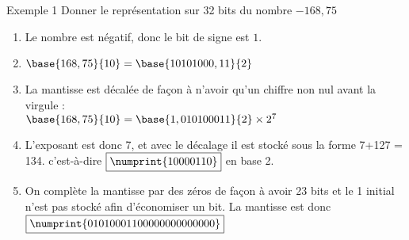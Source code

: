 \documentclass[10pt,french]{beamer}
\begin{document}
\begin{frame}{\Ctitle}{\stitle}
	\begin{exampleblock}{Exemple 1}
		Donner le représentation sur 32 bits du nombre $-168,75$
		\begin{enumerate}
			\item<2-> Le nombre est négatif, donc le bit de signe est \textcolor{BrickRed}{$\boxed{1}$}.
			\item<3-> $\base{168,75}{10} = \base{10101000,11}{2}$
			\item<4-> La mantisse est décalée de façon à n'avoir qu'un chiffre non nul avant la virgule : \\
				$\base{168,75}{10} = \base{1,010100011}{2} \times 2^{7}$
			\item<5-> L'exposant est donc 7, et avec le décalage il est stocké sous la forme 7+127 = 134. c'est-à-dire \textcolor{blue}{$\boxed{\numprint{10000110}}$} en base 2.
			\item<6-> On complète la mantisse par des zéros de façon à avoir 23 bits et le 1 initial  n'est pas stocké afin d'économiser un bit. La mantisse est donc \textcolor{OliveGreen}{$\boxed{\numprint{01010001100000000000000}}$}
		\end{enumerate}
	\end{exampleblock}
\end{frame}
\end{document}
